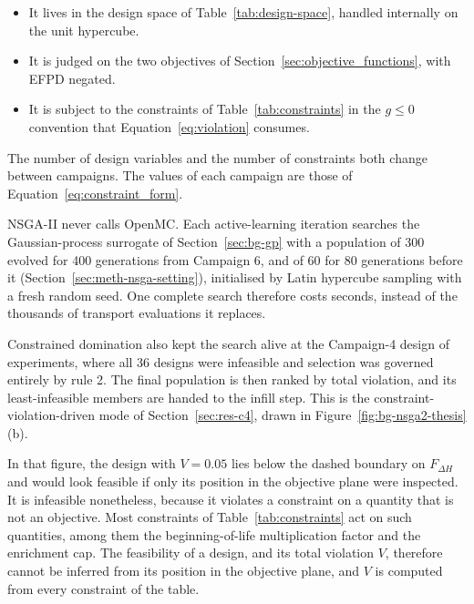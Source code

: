 \begin{itemize}
  \item It lives in the design space of Table~\ref{tab:design-space},
        handled internally on the unit hypercube.

  \item It is judged on the two objectives of
        Section~\ref{sec:objective_functions}, with EFPD negated.

  \item It is subject to the constraints of Table~\ref{tab:constraints}
        in the $g \le 0$ convention that
        Equation~\eqref{eq:violation} consumes.
\end{itemize}

The number of design variables and the number of constraints both
change between campaigns. The values of each campaign are those of
Equation~\eqref{eq:constraint_form}.

NSGA-II never calls OpenMC. Each active-learning iteration searches
the Gaussian-process surrogate of Section~\ref{sec:bg-gp} with a
population of 300 evolved for 400 generations from Campaign 6, and of
60 for 80 generations before it (Section~\ref{sec:meth-nsga-setting}),
initialised by Latin hypercube sampling with a fresh random seed. One complete search
therefore costs seconds, instead of the thousands of transport
evaluations it replaces.

Constrained domination also kept the search alive at the Campaign-4
design of experiments, where all 36 designs were infeasible and
selection was governed entirely by rule 2. The final population is then
ranked by total violation, and its least-infeasible members are handed
to the infill step. This is the constraint-violation-driven mode of
Section~\ref{sec:res-c4}, drawn in Figure~\ref{fig:bg-nsga2-thesis}(b).

In that figure, the design with $V = 0.05$ lies below the dashed
boundary on $F_{\Delta H}$ and would look feasible if only its position
in the objective plane were inspected. It is infeasible nonetheless,
because it violates a constraint on a quantity that is not an
objective. Most constraints of Table~\ref{tab:constraints} act on such
quantities, among them the beginning-of-life multiplication factor and
the enrichment cap. The feasibility of a design, and its total violation
$V$, therefore cannot be inferred from its position in the objective
plane, and $V$ is computed from every constraint of the table.

\FloatBarrier


